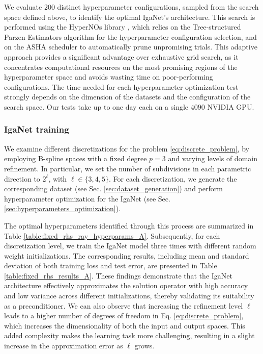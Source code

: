 \documentclass{article}
\newcommand{\reflevel}{\ell} %
\theoremstyle{plain}
\numberwithin{equation}{section}
\begin{document}
We evaluate $200$ distinct hyperparameter configurations, sampled from the search space defined above, to identify the optimal IgaNet's architecture. This search is performed using the HyperNOs library \cite{ghiotto2025hypernos}, which relies on the Tree-structured Parzen Estimators algorithm \cite{watanabe2023tree, bergstra2015hyperopt} for the hyperparameter configuration selection, and on the ASHA scheduler \cite{li2020massivelyparallelhyperparametertuning} to automatically prune unpromising trials. This adaptive approach provides a significant advantage over exhaustive grid search, as it concentrates computational resources on the most promising regions of the hyperparameter space and avoids wasting time on poor-performing configurations. The time needed for each hyperparameter optimization test strongly depends on the dimension of the datasets and the configuration of the search space. Our tests take up to one day each on a single $4090$ NVIDIA GPU.

\subsubsection{IgaNet training}
We examine different discretizations for the problem \eqref{eq:discrete_problem}, by employing B-spline spaces with a fixed degree $p=3$ and varying levels of domain refinement.
In particular, we set the number of subdivisions in each parametric direction to $2^\reflevel$, with $\reflevel \in \{3, 4, 5\}$. For each discretization, we generate the corresponding dataset (see Sec. \ref{sec:dataset_generation}) and perform hyperparameter optimization for the IgaNet (see Sec. \ref{sec:hyperparameters_optimization}).

The optimal hyperparameters identified through this process are summarized in Table \ref{table:fixed_rhs_ray_hyperparams_A}. Subsequently, for each discretization level, we train the IgaNet model three times with different random weight initializations. The corresponding results, including mean and standard deviation of both training loss and test error, are presented in Table \ref{table:fixed_rhs_results_A}. These findings demonstrate that the IgaNet architecture effectively approximates the solution operator with high accuracy and low variance across different initializations, thereby validating its suitability as a preconditioner.
We can also observe that increasing the refinement level $\reflevel$ leads to a higher number of degrees of freedom in Eq. \eqref{eq:discrete_problem}, which increases the dimensionality of both the input and output spaces. This added complexity makes the learning task more challenging, resulting in a slight increase in the approximation error as $\reflevel$ grows.
\end{document}
